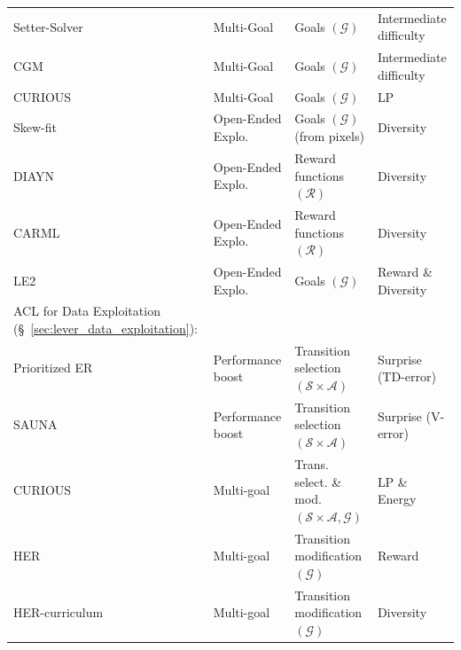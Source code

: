\documentclass{article}
\begin{document}
\begin{table}[htb!]
\begin{tabular}{llll}
Setter-Solver ~\cite{settersolver}               &   Multi-Goal               & Goals  $(\mathcal{G})$                      & Intermediate difficulty                    \\

CGM ~\cite{CGM}                          & Multi-Goal & Goals $(\mathcal{G})$           & Intermediate difficulty      \\

CURIOUS ~\cite{curious}                          & Multi-Goal & Goals $(\mathcal{G})$           & LP      \\

 Skew-fit ~\cite{skewfit}                         & Open-Ended Explo.       & Goals $(\mathcal{G})$ (from pixels)          & Diversity                    \\
  DIAYN \cite{diayn} & Open-Ended Explo. & Reward functions $(\mathcal{R})$ & Diversity \\
 CARML ~\cite{metarl-carml}             & Open-Ended Explo.                        & Reward functions $(\mathcal{R})$          & Diversity       \\

 LE2 ~\cite{le2}                                  & Open-Ended Explo. & Goals $(\mathcal{G})$             & Reward \& Diversity      \\
 \midrule
 ACL for Data Exploitation  (\S~\ref{sec:lever_data_exploitation}):    &               &                  &                          \\
 \midrule
  Prioritized ER ~\cite{per}                       & Performance boost    & Transition selection $(\mathcal{S}\times\mathcal{A})$    & Surprise (TD-error)                 \\
  SAUNA ~\cite{SAUNA}                              & Performance boost    & Transition selection $(\mathcal{S}\times\mathcal{A})$    & Surprise (V-error)               \\ 
  CURIOUS ~\cite{curious}                          &   Multi-goal         & Trans. select. \& mod. $(\mathcal{S}\times\mathcal{A}, \mathcal{G})$          & LP \& Energy      \\
 HER ~\cite{her}      & Multi-goal   & Transition modification $(\mathcal{G})$   & Reward             \\
 
HER-curriculum ~\cite{curriculu-her}     & Multi-goal  & Transition modification $(\mathcal{G})$ &     Diversity                  \\
 

\end{tabular}
\end{table}
\end{document}
